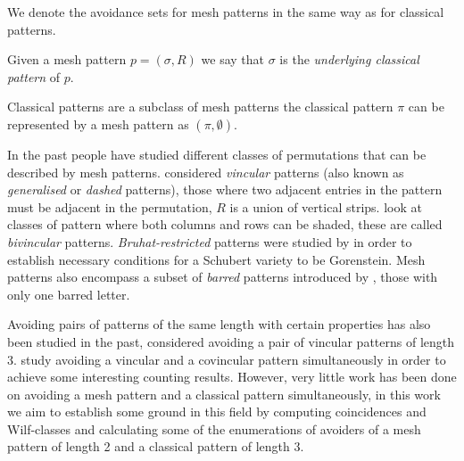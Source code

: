 We denote the avoidance sets for mesh patterns in the same way as for
classical patterns.

Given a mesh pattern \(p=(\sigma,R)\) we say that \(\sigma\) is the \emph{underlying
classical pattern} of \(p\).
\begin{note}
    \label{not:classmesh}
    Classical patterns are a subclass of mesh patterns the classical pattern \(\pi\)
    can be represented by a mesh pattern as \((\pi,\emptyset)\).
\end{note}

In the past people have studied different classes
of permutations that can be described by mesh patterns. \textcite{babstein2000}
considered \emph{vincular} patterns (also known as \emph{generalised} or \emph{dashed} patterns),
those where two adjacent entries in the pattern must be adjacent in the permutation,
\ie \(R\) is a union of vertical strips.
\textcite{MR2652101} look at classes of pattern where both columns and rows
can be shaded, these are called \emph{bivincular} patterns.
\emph{Bruhat-restricted} patterns were studied by \textcite{MR2264071} in order
to establish necessary conditions for a Schubert variety to be Gorenstein.
Mesh patterns also encompass a subset of \emph{barred} patterns introduced by
\textcite{MR2716312}, those with only one barred letter.

Avoiding pairs of patterns of the same length with certain properties has
also been studied in the past, \textcite{MR2178749} considered avoiding a
pair of vincular patterns of length 3. \textcite{2015arXiv151203226B} study avoiding
a vincular and a covincular pattern simultaneously in order to achieve some
interesting counting results. However, very little work has been done on avoiding
a mesh pattern and a classical pattern simultaneously, in this work we aim to
establish some ground in this field by computing coincidences and Wilf-classes
and calculating some of the enumerations of avoiders of a mesh pattern of length
2 and a classical pattern of length 3.

